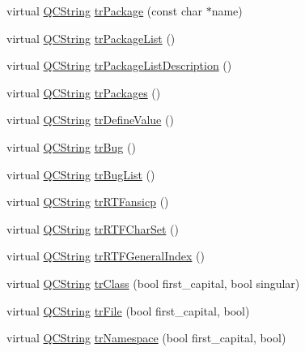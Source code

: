 \begin{DoxyCompactItemize}
virtual \mbox{\hyperlink{class_q_c_string}{Q\+C\+String}} \mbox{\hyperlink{class_translator_italian_a9a4086694c96b8514cc9d950e84c183b}{tr\+Package}} (const char $\ast$name)
\item 
virtual \mbox{\hyperlink{class_q_c_string}{Q\+C\+String}} \mbox{\hyperlink{class_translator_italian_a8bb0aa34cffc661455c1505b4248b8ec}{tr\+Package\+List}} ()
\item 
virtual \mbox{\hyperlink{class_q_c_string}{Q\+C\+String}} \mbox{\hyperlink{class_translator_italian_a502041bed3574cd6ad63a0288974d991}{tr\+Package\+List\+Description}} ()
\item 
virtual \mbox{\hyperlink{class_q_c_string}{Q\+C\+String}} \mbox{\hyperlink{class_translator_italian_a5ece15f5847e8e57cdb3003d6f406bd0}{tr\+Packages}} ()
\item 
virtual \mbox{\hyperlink{class_q_c_string}{Q\+C\+String}} \mbox{\hyperlink{class_translator_italian_a0a727d05e312fe42fa6e8888bf569476}{tr\+Define\+Value}} ()
\item 
virtual \mbox{\hyperlink{class_q_c_string}{Q\+C\+String}} \mbox{\hyperlink{class_translator_italian_ab2283ed706ea31ed9ba1ee7f8ea64c18}{tr\+Bug}} ()
\item 
virtual \mbox{\hyperlink{class_q_c_string}{Q\+C\+String}} \mbox{\hyperlink{class_translator_italian_a3a0c0ea29db7016556e5dc167e3c1c28}{tr\+Bug\+List}} ()
\item 
virtual \mbox{\hyperlink{class_q_c_string}{Q\+C\+String}} \mbox{\hyperlink{class_translator_italian_a27b5da596f7778f5167ea53e5294f418}{tr\+R\+T\+Fansicp}} ()
\item 
virtual \mbox{\hyperlink{class_q_c_string}{Q\+C\+String}} \mbox{\hyperlink{class_translator_italian_a84e928830059a03c4be6680998820f25}{tr\+R\+T\+F\+Char\+Set}} ()
\item 
virtual \mbox{\hyperlink{class_q_c_string}{Q\+C\+String}} \mbox{\hyperlink{class_translator_italian_a119438dfb5ccefab32e500b8b8d8ee7a}{tr\+R\+T\+F\+General\+Index}} ()
\item 
virtual \mbox{\hyperlink{class_q_c_string}{Q\+C\+String}} \mbox{\hyperlink{class_translator_italian_a43814783b774642e4f9aa38592e00ffd}{tr\+Class}} (bool first\+\_\+capital, bool singular)
\item 
virtual \mbox{\hyperlink{class_q_c_string}{Q\+C\+String}} \mbox{\hyperlink{class_translator_italian_a9229cf743df7121024614b8b60603427}{tr\+File}} (bool first\+\_\+capital, bool)
\item 
virtual \mbox{\hyperlink{class_q_c_string}{Q\+C\+String}} \mbox{\hyperlink{class_translator_italian_adb8ad11a5f174e4540487bad78e4ca31}{tr\+Namespace}} (bool first\+\_\+capital, bool)

\end{DoxyCompactItemize}
